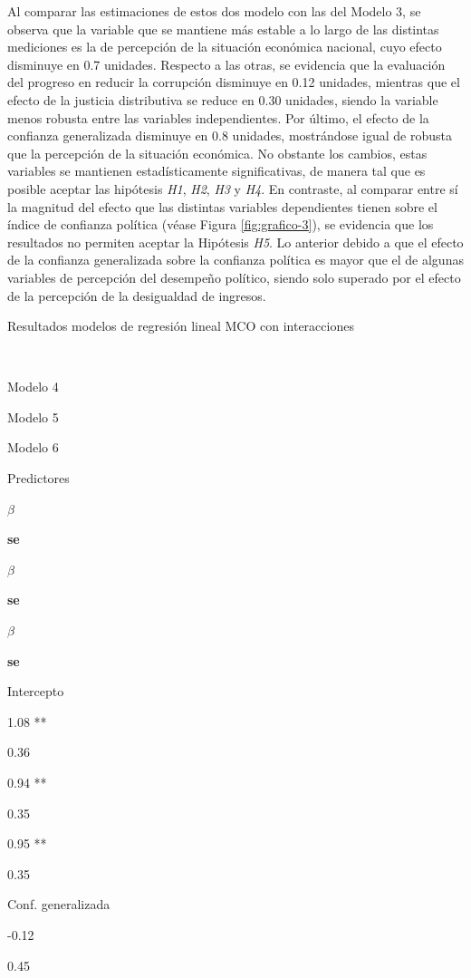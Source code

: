 \documentclass[12pt,twoside]{templates/facsothesis}
\begin{document}
Al comparar las estimaciones de estos dos modelo con las del Modelo 3, se observa que la variable que se mantiene más estable a lo largo de las distintas mediciones es la de percepción de la situación económica nacional, cuyo efecto disminuye en 0.7 unidades. Respecto a las otras, se evidencia que la evaluación del progreso en reducir la corrupción disminuye en 0.12 unidades, mientras que el efecto de la justicia distributiva se reduce en 0.30 unidades, siendo la variable menos robusta entre las variables independientes. Por último, el efecto de la confianza generalizada disminuye en 0.8 unidades, mostrándose igual de robusta que la percepción de la situación económica. No obstante los cambios, estas variables se mantienen estadísticamente significativas, de manera tal que es posible aceptar las hipótesis \emph{H1}, \emph{H2}, \emph{H3} y \emph{H4}. En contraste, al comparar entre sí la magnitud del efecto que las distintas variables dependientes tienen sobre el índice de confianza política (véase Figura \ref{fig:grafico-3}), se evidencia que los resultados no permiten aceptar la Hipótesis \emph{H5}. Lo anterior debido a que el efecto de la confianza generalizada sobre la confianza política es mayor que el de algunas variables de percepción del desempeño político, siendo solo superado por el efecto de la percepción de la desigualdad de ingresos.

\label{tab:tabla-interacciones} Resultados modelos de regresión lineal MCO con interacciones

~

Modelo 4

Modelo 5

Modelo 6

Predictores

\textbf{\(\beta\)}

\textbf{se}

\textbf{\(\beta\)}

\textbf{se}

\textbf{\(\beta\)}

\textbf{se}

Intercepto

1.08 **

0.36

0.94 **

0.35

0.95 **

0.35

Conf. generalizada

-0.12

0.45
\end{document}
